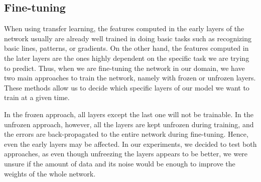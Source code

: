 \subsection{Fine-tuning}

When using transfer learning, the features computed in the early layers of the network usually are already well trained in doing basic tasks such as recognizing basic lines, patterns, or gradients. On the other hand, the features computed in the later layers are the ones highly dependent on the specific task we are trying to predict. Thus, when we are fine-tuning the network in our domain, we have two main approaches to train the network, namely with frozen or unfrozen layers. These methods allow us to decide which specific layers of our model we want to train at a given time. 

In the frozen approach, all layers except the last one will not be trainable. In the unfrozen approach, however, all the layers are kept unfrozen during training, and the errors are back-propagated to the entire network during fine-tuning. Hence, even the early layers may be affected. In our experiments, we decided to test both approaches, as even though unfreezing the layers appears to be better, we were unsure if the amount of data and its noise would be enough to improve the weights of the whole network.




